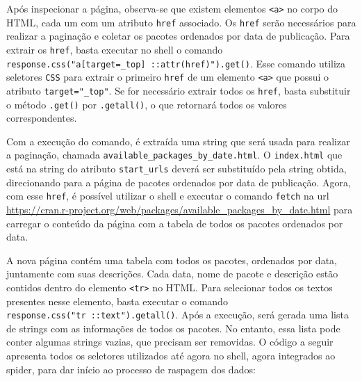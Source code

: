 \documentclass[
  12pt,
  a4paper,
]{scrreprt}
\begin{document}
Após inspecionar a página, observa-se que existem elementos
\texttt{\textless{}a\textgreater{}} no corpo do HTML, cada um com um
atributo \texttt{href} associado. Os \texttt{href} serão necessários
para realizar a paginação e coletar os pacotes ordenados por data de
publicação. Para extrair os \texttt{href}, basta executar no shell o
comando
\texttt{response.css("a{[}target=\_top{]}\ ::attr(href)").get()}. Esse
comando utiliza seletores \texttt{CSS} para extrair o primeiro
\texttt{href} de um elemento \texttt{\textless{}a\textgreater{}} que
possui o atributo \texttt{target="\_top"}. Se for necessário extrair
todos os \texttt{href}, basta substituir o método \texttt{.get()} por
\texttt{.getall()}, o que retornará todos os valores correspondentes.

\vspace{12pt}

Com a execução do comando, é extraída uma string que será usada para
realizar a paginação, chamada
\texttt{\textquotesingle{}available\_packages\_by\_date.html\textquotesingle{}}.
O \texttt{\textquotesingle{}index.html\textquotesingle{}} que está na
string do atributo \texttt{start\_urls} deverá ser substituído pela
string obtida, direcionando para a página de pacotes ordenados por data
de publicação. Agora, com esse \texttt{href}, é possível utilizar o
shell e executar o comando \texttt{fetch} na url
\url{https://cran.r-project.org/web/packages/available_packages_by_date.html}
para carregar o conteúdo da página com a tabela de todos os pacotes
ordenados por data.

\vspace{12pt}

A nova página contém uma tabela com todos os pacotes, ordenados por
data, juntamente com suas descrições. Cada data, nome de pacote e
descrição estão contidos dentro do elemento
\texttt{\textless{}tr\textgreater{}} no HTML. Para selecionar todos os
textos presentes nesse elemento, basta executar o comando
\texttt{response.css("tr\ ::text").getall()}. Após a execução, será
gerada uma lista de strings com as informações de todos os pacotes. No
entanto, essa lista pode conter algumas strings vazias, que precisam ser
removidas. O código a seguir apresenta todos os seletores utilizados até
agora no shell, agora integrados ao spider, para dar início ao processo
de raspagem dos dados:
\end{document}
